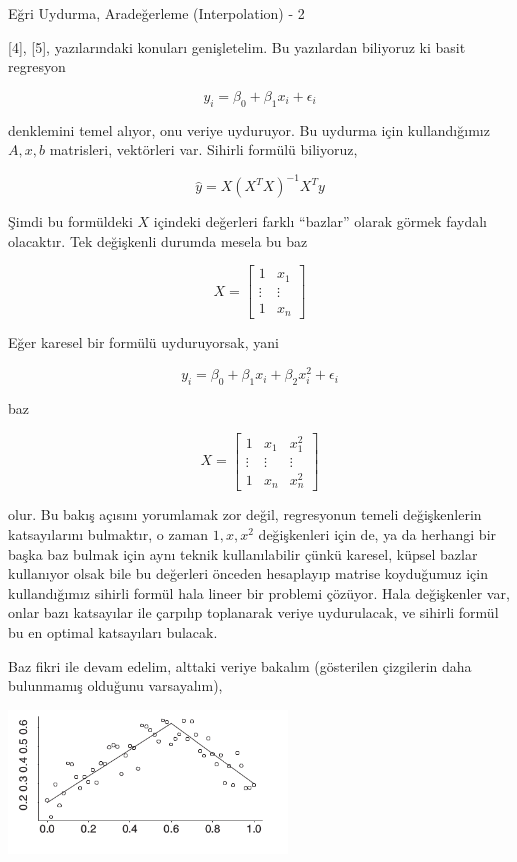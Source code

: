 \documentclass[12pt,fleqn]{article}\usepackage{../../common}
\begin{document}
Eğri Uydurma, Aradeğerleme (Interpolation) - 2

[4], [5], yazılarındaki konuları genişletelim. Bu yazılardan biliyoruz ki basit
regresyon

$$ y_i = \beta_0 + \beta_1 x_i + \epsilon_i$$

denklemini temel alıyor, onu veriye uyduruyor. Bu uydurma için
kullandığımız $A,x,b$ matrisleri, vektörleri var. Sihirli formülü
biliyoruz, 

$$ \hat{y} = X(X^TX)^{-1}X^Ty $$

Şimdi bu formüldeki $X$ içindeki değerleri farklı ``bazlar'' olarak görmek
faydalı olacaktır. Tek değişkenli durumda mesela bu baz

$$ X = 
\left[\begin{array}{cc}
1 & x_1 \\ \vdots & \vdots \\ 1 & x_n
\end{array}\right]
$$

Eğer karesel bir formülü uyduruyorsak, yani

$$ y_i = \beta_0 + \beta_1x_i + \beta_2x_i^2 + \epsilon_i $$

baz 

$$ X = 
\left[\begin{array}{ccc}
1 & x_1 & x_1^2\\ 
\vdots & \vdots & \vdots \\
1 & x_n & x_n^2
\end{array}\right]
$$

olur. Bu bakış açısını yorumlamak zor değil, regresyonun temeli
değişkenlerin katsayılarını bulmaktır, o zaman $1,x,x^2$ değişkenleri için
de, ya da herhangi bir başka baz bulmak için aynı teknik kullanılabilir
çünkü karesel, küpsel bazlar kullanıyor olsak bile bu değerleri önceden
hesaplayıp matrise koyduğumuz için kullandığımız sihirli formül hala lineer
bir problemi çözüyor. Hala değişkenler var, onlar bazı katsayılar ile
çarpılıp toplanarak veriye uydurulacak, ve sihirli formül bu en optimal
katsayıları bulacak.

Baz fikri ile devam edelim, alttaki veriye bakalım (gösterilen çizgilerin
daha bulunmamış olduğunu varsayalım),

\includegraphics[width=20em]{compscieng_app20_04.png}
\end{document}
